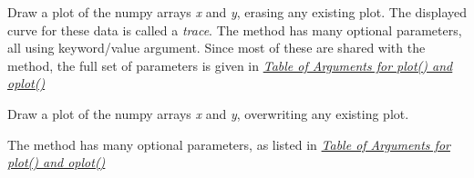 \documentclass[letterpaper,10pt,english]{sphinxmanual}
\begin{document}
\begin{fulllineitems}
\label{plotpanel:plot}
Draw a plot of the numpy arrays \emph{x} and \emph{y}, erasing any existing plot.  The
displayed curve for these data is called a \emph{trace}.  The {\hyperref[plotpanel:plot]{}} method
has many optional parameters, all using keyword/value argument.  Since most
of these are shared with the {\hyperref[plotpanel:oplot]{}} method, the full set of parameters
is given in {\hyperref[plotpanel:plotopt-table]{\emph{Table of Arguments for plot() and oplot()}}}

\end{fulllineitems}



\begin{fulllineitems}
\label{plotpanel:oplot}
Draw a plot of the numpy arrays \emph{x} and \emph{y}, overwriting any existing plot.

The {\hyperref[plotpanel:oplot]{}} method has many optional parameters,  as listed in
{\hyperref[plotpanel:plotopt-table]{\emph{Table of Arguments for plot() and oplot()}}}

\end{fulllineitems}
\end{document}
